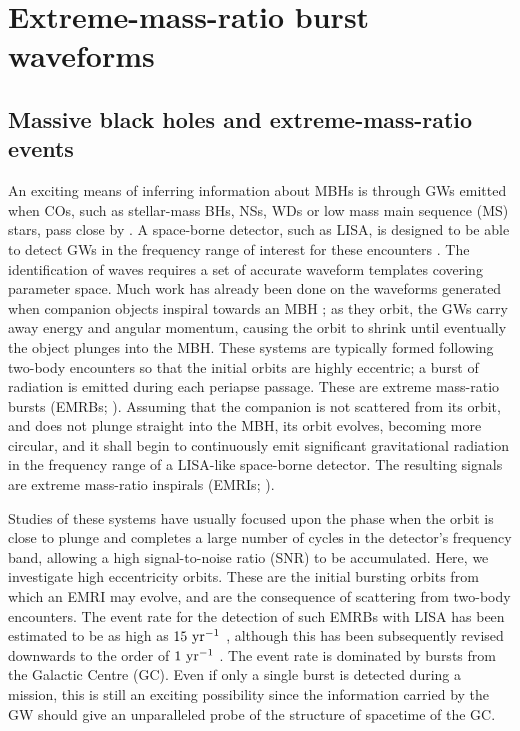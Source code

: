\chapter{Extreme-mass-ratio burst waveforms}\label{ch:waveforms}

\section{Massive black holes and extreme-mass-ratio events}

An exciting means of inferring information about MBHs is through GWs emitted when COs, such as stellar-mass BHs, NSs, WDs or low mass main sequence (MS) stars, pass close by \citep{Sathyaprakash2009}. A space-borne detector, such as LISA, is designed to be able to detect GWs in the frequency range of interest for these encounters \citep{Danzmann2003, Jennrich2011, Amaro-Seoane2012a}. The identification of waves requires a set of accurate waveform templates covering parameter space. Much work has already been done on the waveforms generated when companion objects inspiral towards an MBH \citep{Glampedakis2005, Barack2009}; as they orbit, the GWs carry away energy and angular momentum, causing the orbit to shrink until eventually the object plunges into the MBH. These systems are typically formed following two-body encounters so that the initial orbits are highly eccentric; a burst of radiation is emitted during each periapse passage. These are extreme mass-ratio bursts (EMRBs; \citealt{Rubbo2006}). Assuming that the companion is not scattered from its orbit, and does not plunge straight into the MBH, its orbit evolves, becoming more circular, and it shall begin to continuously emit significant gravitational radiation in the frequency range of a LISA-like space-borne detector. The resulting signals are extreme mass-ratio inspirals (EMRIs; \citealt{Amaro-Seoane2007}).

Studies of these systems have usually focused upon the phase when the orbit is close to plunge and completes a large number of cycles in the detector's frequency band, allowing a high signal-to-noise ratio (SNR) to be accumulated. Here, we investigate high eccentricity orbits. These are the initial bursting orbits from which an EMRI may evolve, and are the consequence of scattering from two-body encounters. The event rate for the detection of such EMRBs with LISA has been estimated to be as high as $15~\mathrm{yr^{-1}}$ \citep{Rubbo2006}, although this has been subsequently revised downwards to the order of $1~\mathrm{yr^{-1}}$ \citep{Hopman2007}. The event rate is dominated by bursts from the Galactic Centre (GC). Even if only a single burst is detected during a mission, this is still an exciting possibility since the information carried by the GW should give an unparalleled probe of the structure of spacetime of the GC.

